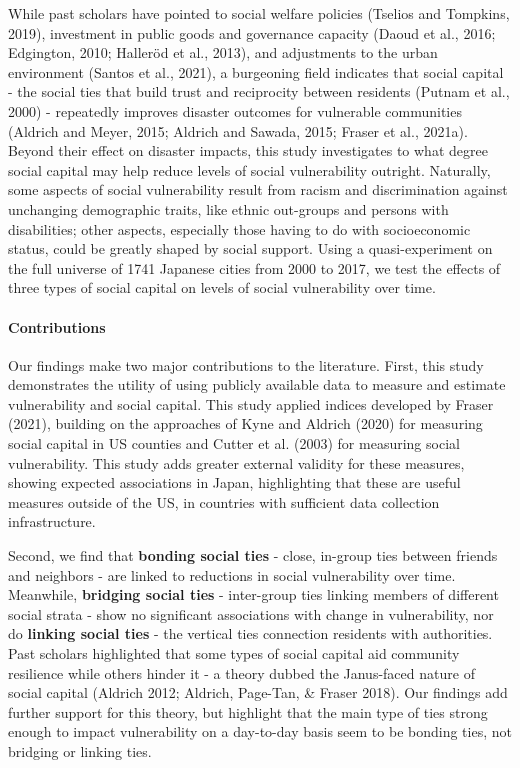 \documentclass[]{elsarticle} %
\begin{document}
While past scholars have pointed to social welfare policies (Tselios and
Tompkins, 2019), investment in public goods and governance capacity
(Daoud et al., 2016; Edgington, 2010; Halleröd et al., 2013), and
adjustments to the urban environment (Santos et al., 2021), a burgeoning
field indicates that social capital - the social ties that build trust
and reciprocity between residents (Putnam et al., 2000) - repeatedly
improves disaster outcomes for vulnerable communities (Aldrich and
Meyer, 2015; Aldrich and Sawada, 2015; Fraser et al., 2021a). Beyond
their effect on disaster impacts, this study investigates to what degree
social capital may help reduce levels of social vulnerability outright.
Naturally, some aspects of social vulnerability result from racism and
discrimination against unchanging demographic traits, like ethnic
out-groups and persons with disabilities; other aspects, especially
those having to do with socioeconomic status, could be greatly shaped by
social support. Using a quasi-experiment on the full universe of 1741
Japanese cities from 2000 to 2017, we test the effects of three types of
social capital on levels of social vulnerability over time.

\hypertarget{contributions}{%
\paragraph{Contributions}\label{contributions}}

Our findings make two major contributions to the literature. First, this
study demonstrates the utility of using publicly available data to
measure and estimate vulnerability and social capital. This study
applied indices developed by Fraser (2021), building on the approaches
of Kyne and Aldrich (2020) for measuring social capital in US counties
and Cutter et al. (2003) for measuring social vulnerability. This study
adds greater external validity for these measures, showing expected
associations in Japan, highlighting that these are useful measures
outside of the US, in countries with sufficient data collection
infrastructure.

Second, we find that \textbf{bonding social ties} - close, in-group ties
between friends and neighbors - are linked to reductions in social
vulnerability over time. Meanwhile, \textbf{bridging social ties} -
inter-group ties linking members of different social strata - show no
significant associations with change in vulnerability, nor do
\textbf{linking social ties} - the vertical ties connection residents
with authorities. Past scholars highlighted that some types of social
capital aid community resilience while others hinder it - a theory
dubbed the Janus-faced nature of social capital (Aldrich 2012; Aldrich,
Page-Tan, \& Fraser 2018). Our findings add further support for this
theory, but highlight that the main type of ties strong enough to impact
vulnerability on a day-to-day basis seem to be bonding ties, not
bridging or linking ties.
\end{document}
